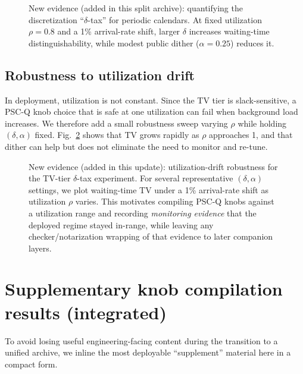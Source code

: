 \documentclass[11pt]{article}
\theoremstyle{definition}
\theoremstyle{remark}
\begin{document}
\begin{figure}[t]
\centering
{}
\caption{New evidence (added in this split archive): quantifying the discretization ``$\delta$-tax'' for periodic calendars.
At fixed utilization $\rho=0.8$ and a 1\% arrival-rate shift, larger $\delta$ increases waiting-time distinguishability, while modest public dither ($\alpha=0.25$) reduces it.}
\label{fig:deltatax}
\end{figure}

\subsection{Robustness to utilization drift}
In deployment, utilization is not constant.
Since the TV tier is slack-sensitive, a PSC-Q knob choice that is safe at one utilization can fail when background load increases.
We therefore add a small robustness sweep varying $\rho$ while holding $(\delta,\alpha)$ fixed.
Fig.~\ref{fig:drift} shows that TV grows rapidly as $\rho$ approaches 1, and that dither can help but does not eliminate the need to monitor and re-tune.

\begin{figure}[t]
\centering
{}
\caption{New evidence (added in this update): utilization-drift robustness for the TV-tier $\delta$-tax experiment.
For several representative $(\delta,\alpha)$ settings, we plot waiting-time TV under a 1\% arrival-rate shift as utilization $\rho$ varies.
This motivates compiling PSC-Q knobs against a utilization range and recording \emph{monitoring evidence} that the deployed regime stayed in-range, while leaving any checker/notarization wrapping of that evidence to later companion layers.}
\label{fig:drift}
\end{figure}



\section{Supplementary knob compilation results (integrated)}
To avoid losing useful engineering-facing content during the transition to a unified archive,
we inline the most deployable ``supplement'' material here in a compact form.
\end{document}
